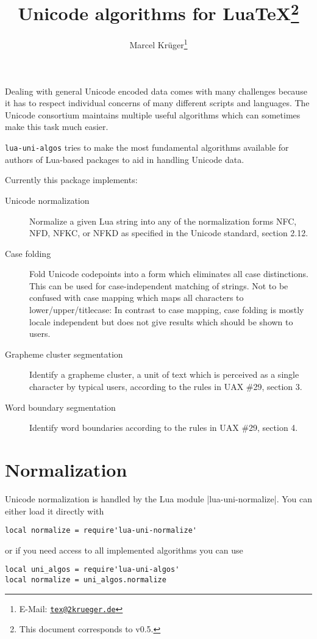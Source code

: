 \documentclass{article}
\title{Unicode algorithms for Lua\TeX\thanks{This document corresponds to \pkg{lua-uni-algos} v0.5.}}
\author{Marcel Krüger\thanks{E-Mail: \href{mailto:tex@2krueger.de}{\nolinkurl{tex@2krueger.de}}}}
\newcommand\pkg{\texttt}
\begin{document}
\maketitle
Dealing with general Unicode encoded data comes with many challenges because it has to respect individual concerns of many different scripts and languages. The Unicode consortium maintains multiple useful algorithms which can sometimes make this task much easier.

\pkg{lua-uni-algos} tries to make the most fundamental algorithms available for authors of Lua-based packages to aid in handling Unicode data.

Currently this package implements:
\begin{description}
  \item[Unicode normalization] Normalize a given Lua string into any of the normalization forms NFC, NFD, NFKC, or NFKD as specified in the Unicode standard, section 2.12.
  \item[Case folding] Fold Unicode codepoints into a form which eliminates all case distinctions. This can be used for case-independent matching of strings. Not to be confused with case mapping which maps all characters to lower/upper/titlecase: In contrast to case mapping, case folding is mostly locale independent but does not give results which should be shown to users.
  \item[Grapheme cluster segmentation] Identify a grapheme cluster, a unit of text which is perceived as a single character by typical users, according to the rules in UAX \#29, section 3.
  \item[Word boundary segmentation] Identify word boundaries according to the rules in UAX \#29, section 4.
\end{description}
\section{Normalization}
Unicode normalization is handled by the Lua module |lua-uni-normalize|.
You can either load it directly with
\begin{verbatim}
local normalize = require'lua-uni-normalize'
\end{verbatim}
or if you need access to all implemented algorithms you can use
\begin{verbatim}
local uni_algos = require'lua-uni-algos'
local normalize = uni_algos.normalize
\end{verbatim}
\end{document}
